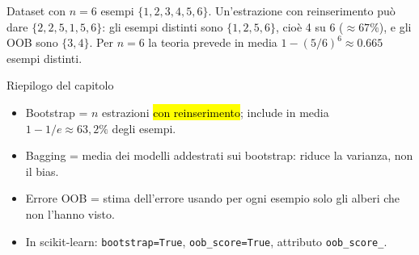 \begin{esempio}
Dataset con $n=6$ esempi $\{1,2,3,4,5,6\}$. Un'estrazione con reinserimento può dare $\{2,2,5,1,5,6\}$: gli esempi distinti sono $\{1,2,5,6\}$, cioè 4 su 6 ($\approx 67\%$), e gli OOB sono $\{3,4\}$. Per $n=6$ la teoria prevede in media $1-(5/6)^6\approx 0.665$ esempi distinti.
\end{esempio}

\begin{appunti}{Riepilogo del capitolo}
\begin{itemize}
  \item Bootstrap = $n$ estrazioni \hl{con reinserimento}; include in media $1-1/e\approx63{,}2\%$ degli esempi.
  \item Bagging = media dei modelli addestrati sui bootstrap: riduce la varianza, non il bias.
  \item Errore OOB = stima dell'errore usando per ogni esempio solo gli alberi che non l'hanno visto.
  \item In scikit-learn: \texttt{bootstrap=True}, \texttt{oob\_score=True}, attributo \texttt{oob\_score\_}.
\end{itemize}
\end{appunti}
